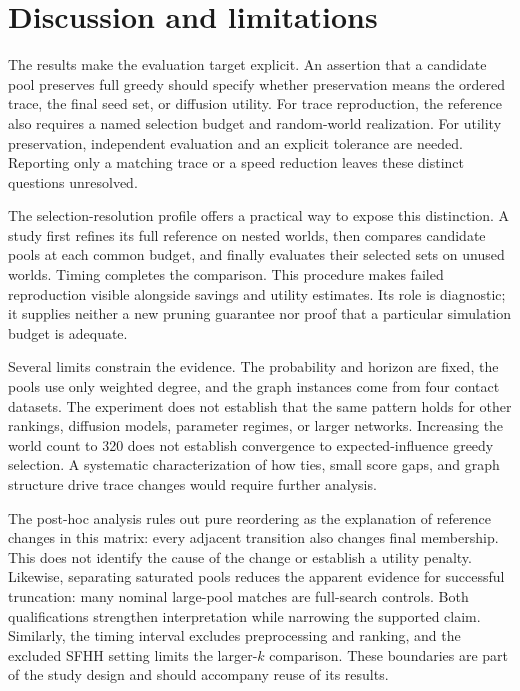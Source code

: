 \documentclass[smallextended]{svjour3}
\begin{document}
\section{Discussion and limitations}

The results make the evaluation target explicit. An assertion that a candidate pool preserves full greedy should specify whether preservation means the ordered trace, the final seed set, or diffusion utility. For trace reproduction, the reference also requires a named selection budget and random-world realization. For utility preservation, independent evaluation and an explicit tolerance are needed. Reporting only a matching trace or a speed reduction leaves these distinct questions unresolved.

The selection-resolution profile offers a practical way to expose this distinction. A study first refines its full reference on nested worlds, then compares candidate pools at each common budget, and finally evaluates their selected sets on unused worlds. Timing completes the comparison. This procedure makes failed reproduction visible alongside savings and utility estimates. Its role is diagnostic; it supplies neither a new pruning guarantee nor proof that a particular simulation budget is adequate.

Several limits constrain the evidence. The probability and horizon are fixed, the pools use only weighted degree, and the graph instances come from four contact datasets. The experiment does not establish that the same pattern holds for other rankings, diffusion models, parameter regimes, or larger networks. Increasing the world count to 320 does not establish convergence to expected-influence greedy selection. A systematic characterization of how ties, small score gaps, and graph structure drive trace changes would require further analysis.

The post-hoc analysis rules out pure reordering as the explanation of reference changes in this matrix: every adjacent transition also changes final membership. This does not identify the cause of the change or establish a utility penalty. Likewise, separating saturated pools reduces the apparent evidence for successful truncation: many nominal large-pool matches are full-search controls. Both qualifications strengthen interpretation while narrowing the supported claim. Similarly, the timing interval excludes preprocessing and ranking, and the excluded SFHH setting limits the larger-\(k\) comparison. These boundaries are part of the study design and should accompany reuse of its results.
\end{document}
